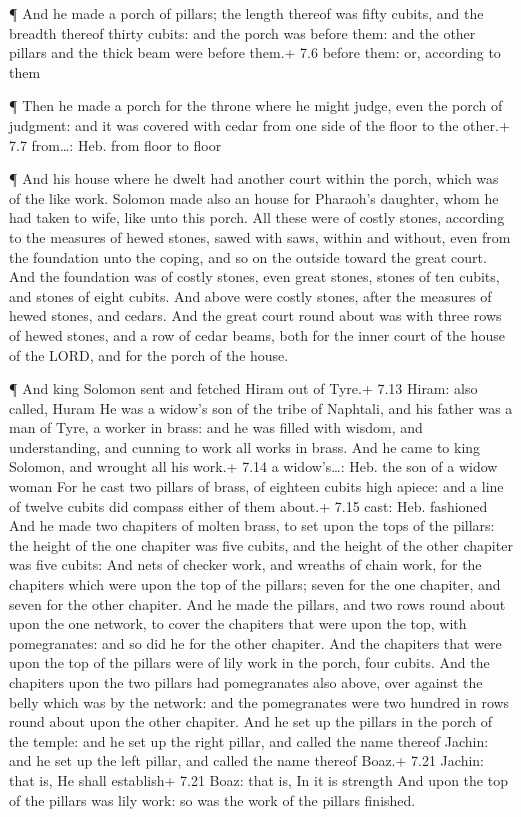  ¶ And he made a porch of pillars; the length thereof was
fifty cubits, and the breadth thereof thirty cubits: and the porch was
before them: and the other pillars and the thick beam were before them.+
7.6 before them: or, according to them

 ¶ Then he made a porch for the throne where he might judge,
even the porch of judgment: and it was covered with cedar from one side
of the floor to the other.+ 7.7 from\ldots: Heb. from floor to floor

 ¶ And his house where he dwelt had another court within the
porch, which was of the like work. Solomon made also an house for
Pharaoh's daughter, whom he had taken to wife, like unto this porch.
 All these were of costly stones, according to the measures
of hewed stones, sawed with saws, within and without, even from the
foundation unto the coping, and so on the outside toward the great
court.  And the foundation was of costly stones, even great
stones, stones of ten cubits, and stones of eight cubits. 
And above were costly stones, after the measures of hewed stones, and
cedars.  And the great court round about was with three
rows of hewed stones, and a row of cedar beams, both for the inner court
of the house of the LORD, and for the porch of the house.

 ¶ And king Solomon sent and fetched Hiram out of Tyre.+
7.13 Hiram: also called, Huram  He was a widow's son of the
tribe of Naphtali, and his father was a man of Tyre, a worker in brass:
and he was filled with wisdom, and understanding, and cunning to work
all works in brass. And he came to king Solomon, and wrought all his
work.+ 7.14 a widow's\ldots: Heb. the son of a widow woman 
For he cast two pillars of brass, of eighteen cubits high apiece: and a
line of twelve cubits did compass either of them about.+ 7.15 cast: Heb.
fashioned  And he made two chapiters of molten brass, to
set upon the tops of the pillars: the height of the one chapiter was
five cubits, and the height of the other chapiter was five cubits:
 And nets of checker work, and wreaths of chain work, for
the chapiters which were upon the top of the pillars; seven for the one
chapiter, and seven for the other chapiter.  And he made
the pillars, and two rows round about upon the one network, to cover the
chapiters that were upon the top, with pomegranates: and so did he for
the other chapiter.  And the chapiters that were upon the
top of the pillars were of lily work in the porch, four cubits.
 And the chapiters upon the two pillars had pomegranates
also above, over against the belly which was by the network: and the
pomegranates were two hundred in rows round about upon the other
chapiter.  And he set up the pillars in the porch of the
temple: and he set up the right pillar, and called the name thereof
Jachin: and he set up the left pillar, and called the name thereof
Boaz.+ 7.21 Jachin: that is, He shall establish+ 7.21 Boaz: that is, In
it is strength  And upon the top of the pillars was lily
work: so was the work of the pillars finished.

